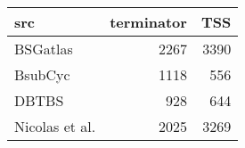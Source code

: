 \centering
\begin{tabular}{lrr}
\toprule
src & terminator & TSS\\
\midrule
BSGatlas & 2267 & 3390\\
BsubCyc & 1118 & 556\\
DBTBS & 928 & 644\\
Nicolas et al. & 2025 & 3269\\
\bottomrule
\end{tabular}
